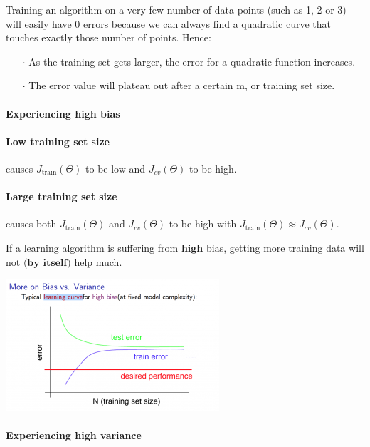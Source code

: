 \documentclass[UTF8]{article}
\begin{document}
Training an algorithm on a very few number of data points (such as 1, 2 or 3) will easily have 0 errors because we can always find a quadratic curve that touches exactly those number of points. Hence:

\begin{itemize}
\item[$\cdot$]As the training set gets larger, the error for a quadratic function increases.
\item[$\cdot$]The error value will plateau out after a certain m, or training set size.
\end{itemize}

\paragraph{Experiencing high bias}

\paragraph{Low training set size} causes $J_\text{train}(\Theta)$ to be low and $J_{cv}(\Theta)$ to be high.
\paragraph{Large training set size} causes both $J_\text{train}(\Theta)$ and $J_{cv}(\Theta)$ to be high with $J_\text{train}(\Theta) \approx J_{cv}(\Theta)$.

If a learning algorithm is suffering from $\textbf{high}$ bias, getting more training data will not $\textbf{(by itself)}$ help much.

\includegraphics[width = \textwidth]{NotePics/10_5_1.png}

\paragraph{Experiencing high variance}
\end{document}
